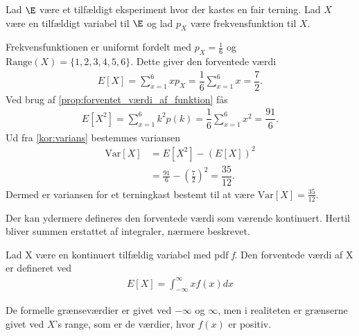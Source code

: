 \begin{eks} \textbf{} %
\newline
Lad $\E$ være et tilfældigt eksperiment hvor der kastes en fair terning. Lad $X$ være en tilfældigt variabel til $\E$ og lad $p_X$ være frekvensfunktion til $X$.


Frekvensfunktionen er uniformt fordelt med $p_X=\frac{1}{6}$ og $\text{Range}(X)=\{1,2,3,4,5,6\}$.
Dette giver den forventede værdi
\begin{align*}
    E[X]=\sum_{x=1}^6 xp_X = \dfrac{1}{6}\sum_{x=1}^6 x=\dfrac{7}{2}.
\end{align*}
Ved brug af \autoref{prop:forventet_værdi_af_funktion} fås
\begin{align*}
    E[X^2]=\sum_{x=1}^6  k^2 p(k) = \dfrac{1}{6} \sum_{x=1}^6 x^2 = \dfrac{91}{6}.
\end{align*}
Ud fra \autoref{kor:varians} bestemmes variansen
\begin{align*}
    \text{Var}[X]  &=E[X^2]-\left(E[X]\right)^2\\
            &=\frac{91}{6} - \left(\frac{7}{2}\right)^2 = \dfrac{35}{12}.
\end{align*}
Dermed er variansen for et terningkast bestemt til at være $\text{Var}[X] = \displaystyle \frac{35}{12}$.
\end{eks}


\iffalse
Der kan ydermere defineres den forventede værdi som værende kontinuert. Hertil bliver summen erstattet af integraler, nærmere beskrevet.

\begin{minipage}\textwidth \label{Definition 2.9}
\begin{defn}\textbf{} %
\newline
Lad X være en kontinuert tilfældig variabel med pdf \textit{f}. Den forventede værdi af X er defineret ved\\
\begin{align*}
    E[X]=\int_{-\infty}^\infty xf(x)dx
\end{align*}
\end{defn}
\end{minipage}

De formelle grænseværdier er givet ved $-\infty$ og $\infty$, men i realiteten er grænserne givet ved $X$'s range, som er de  værdier, hvor $f(x)$ er positiv.\\

